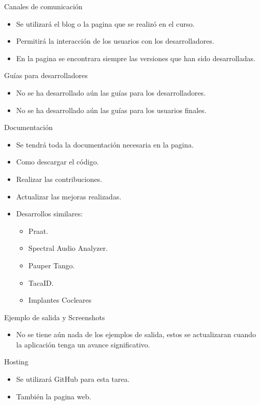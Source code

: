 \documentclass[pstricks, 12pt]{beamer}
\begin{document}
\begin{frame}{Canales de comunicación}
 \begin{itemize}
  \item Se utilizará el blog o la pagina que se realizó en el curso.
  \item Permitirá la interacción de los usuarios con los desarrolladores.
  \item En la pagina se encontrara siempre las versiones que han sido desarrolladas.
 \end{itemize}
\end{frame}

\begin{frame}{Guías para desarrolladores}
 \begin{itemize}
  \item No se ha desarrollado aún las guías para los desarrolladores.
  \item No se ha desarrollado aún las guías para los usuarios finales.
 \end{itemize}
\end{frame}

\begin{frame}{Documentación}
 \begin{itemize}
  \item Se tendrá toda la documentación necesaria  en la pagina.
  \item Como descargar el código.
  \item Realizar las contribuciones.
  \item Actualizar las mejoras realizadas.
  \item Desarrollos similares:
  \begin{itemize}
   \item Praat.
   \item Spectral Audio Analyzer.
   \item Pauper Tango.
   \item TacaID.
   \item Implantes Cocleares
  \end{itemize}
 \end{itemize}
\end{frame}

\begin{frame}{Ejemplo de salida y Screenshots}
 \begin{itemize}
  \item No se tiene aún nada de los ejemplos de salida, estos se actualizaran cuando la aplicación tenga un avance significativo.
 \end{itemize}
\end{frame}

\begin{frame}{Hosting}
 \begin{itemize}
  \item Se utilizará GitHub para esta tarea.
  \item También la pagina web.
 \end{itemize}
\end{frame}
\end{document}
